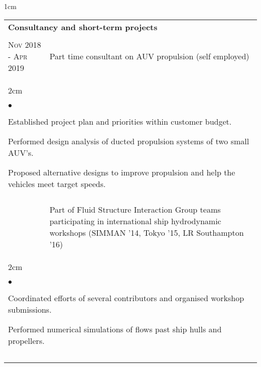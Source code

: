 \documentclass[a4paper,10pt]{article}
\newcommand{\squishlist}{
	\begin{list}{$\bullet$}
	{
		\setlength{\itemsep}{0pt}
		\setlength{\parsep}{0pt}
		\setlength{\topsep}{0pt}
		\setlength{\partopsep}{0pt}
		\setlength{\leftmargin}{2em}
		\setlength{\labelwidth}{1.5em}
		\setlength{\labelsep}{0.5em}
	}
}
\newcommand{\squishend}{\end{list}}
\begin{document}
\begin{minipage}{\textwidth}
\begin{adjustwidth}{}{1cm}
\begin{tabular}{p{3.5cm} p{12.9cm}}
\\
\multicolumn{2}{l}{\textbf{Consultancy and short-term projects}} \\
\\

\textsc{Nov 2018 - Apr 2019} & Part time consultant on AUV propulsion (self employed) \\
%
\multicolumn{2}{l}{
\hspace{1cm}\begin{minipage}[t]{\textwidth}
\begin{adjustwidth}{}{2cm}
\squishlist
	\item Established project plan and priorities within customer budget.
	\item Performed design analysis of ducted propulsion systems of two small AUV's.
	\item Proposed alternative designs to improve propulsion and help the vehicles meet target speeds.
\squishend
\end{adjustwidth}
\end{minipage}
} \\
\\

\begin{comment}
\textsc{Dec 2014, Dec 2015, Oct 2016} & Part of Fluid Structure Interaction Group teams
		participating in international ship hydrodynamic workshops
		(SIMMAN '14, Tokyo '15, LR Southampton '16) \vspace{0.1cm} \\
%
\multicolumn{2}{l}{
\hspace{1cm}\begin{minipage}[t]{\textwidth}
\begin{adjustwidth}{}{2cm}
\squishlist
	\item Coordinated efforts of several contributors and organised workshop submissions.
	\item Performed numerical simulations of flows past ship hulls and propellers.
\squishend
\end{adjustwidth}
\end{minipage}
} \\
\\
\end{comment}


\end{tabular}
\end{adjustwidth}
\end{minipage}
\end{document}
